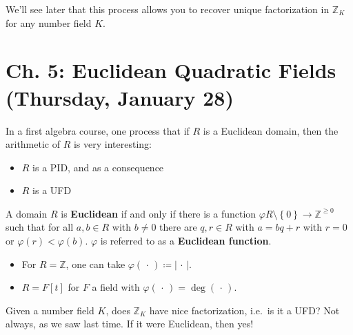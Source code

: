 We'll see later that this process allows you to recover unique
factorization in \({\mathbb{Z}}_K\) for any number field \(K\).

\hypertarget{ch.-5-euclidean-quadratic-fields-thursday-january-28}{%
\section{Ch. 5: Euclidean Quadratic Fields (Thursday, January
28)}\label{ch.-5-euclidean-quadratic-fields-thursday-january-28}}

\begin{remark}

In a first algebra course, one process that if \(R\) is a Euclidean
domain, then the arithmetic of \(R\) is very interesting:

\begin{itemize}
\tightlist
\item
  \(R\) is a PID, and as a consequence
\item
  \(R\) is a UFD
\end{itemize}

\end{remark}

\begin{definition}

A domain \(R\) is \textbf{Euclidean} if and only if there is a function
\(\varphi R\setminus\left\{{0}\right\}\to {\mathbb{Z}}^{\geq 0}\) such
that for all \(a,b\in R\) with \(b\neq 0\) there are \(q, r\in R\) with
\(a = bq + r\) with \(r=0\) or \(\varphi(r) < \varphi(b)\). \(\varphi\)
is referred to as a \textbf{Euclidean function}.

\end{definition}

\begin{example}

\envlist

\begin{itemize}
\tightlist
\item
  For \(R={\mathbb{Z}}\), one can take
  \(\varphi({\,\cdot\,}) \coloneqq{\left\lvert {{\,\cdot\,}} \right\rvert}\).
\item
  \(R = F[t]\) for \(F\) a field with
  \(\varphi({\,\cdot\,}) = \deg({\,\cdot\,})\).
\end{itemize}

\end{example}

\begin{remark}

Given a number field \(K\), does \({\mathbb{Z}}_K\) have nice
factorization, i.e.~is it a UFD? Not always, as we saw last time. If it
were Euclidean, then yes!

\end{remark}

